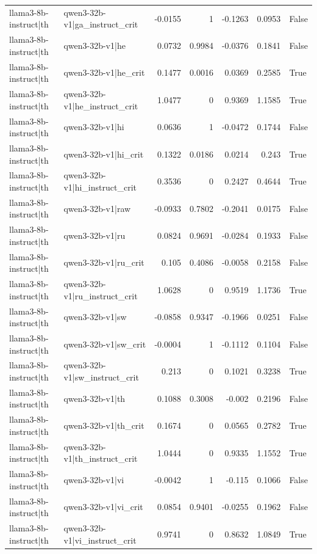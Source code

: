 \begin{table}
\begin{tabular}{l l r r r r l}
llama3-8b-instruct|th & qwen3-32b-v1|ga_instruct_crit & -0.0155 & 1 & -0.1263 & 0.0953 & False \\
llama3-8b-instruct|th & qwen3-32b-v1|he & 0.0732 & 0.9984 & -0.0376 & 0.1841 & False \\
llama3-8b-instruct|th & qwen3-32b-v1|he_crit & 0.1477 & 0.0016 & 0.0369 & 0.2585 & True \\
llama3-8b-instruct|th & qwen3-32b-v1|he_instruct_crit & 1.0477 & 0 & 0.9369 & 1.1585 & True \\
llama3-8b-instruct|th & qwen3-32b-v1|hi & 0.0636 & 1 & -0.0472 & 0.1744 & False \\
llama3-8b-instruct|th & qwen3-32b-v1|hi_crit & 0.1322 & 0.0186 & 0.0214 & 0.243 & True \\
llama3-8b-instruct|th & qwen3-32b-v1|hi_instruct_crit & 0.3536 & 0 & 0.2427 & 0.4644 & True \\
llama3-8b-instruct|th & qwen3-32b-v1|raw & -0.0933 & 0.7802 & -0.2041 & 0.0175 & False \\
llama3-8b-instruct|th & qwen3-32b-v1|ru & 0.0824 & 0.9691 & -0.0284 & 0.1933 & False \\
llama3-8b-instruct|th & qwen3-32b-v1|ru_crit & 0.105 & 0.4086 & -0.0058 & 0.2158 & False \\
llama3-8b-instruct|th & qwen3-32b-v1|ru_instruct_crit & 1.0628 & 0 & 0.9519 & 1.1736 & True \\
llama3-8b-instruct|th & qwen3-32b-v1|sw & -0.0858 & 0.9347 & -0.1966 & 0.0251 & False \\
llama3-8b-instruct|th & qwen3-32b-v1|sw_crit & -0.0004 & 1 & -0.1112 & 0.1104 & False \\
llama3-8b-instruct|th & qwen3-32b-v1|sw_instruct_crit & 0.213 & 0 & 0.1021 & 0.3238 & True \\
llama3-8b-instruct|th & qwen3-32b-v1|th & 0.1088 & 0.3008 & -0.002 & 0.2196 & False \\
llama3-8b-instruct|th & qwen3-32b-v1|th_crit & 0.1674 & 0 & 0.0565 & 0.2782 & True \\
llama3-8b-instruct|th & qwen3-32b-v1|th_instruct_crit & 1.0444 & 0 & 0.9335 & 1.1552 & True \\
llama3-8b-instruct|th & qwen3-32b-v1|vi & -0.0042 & 1 & -0.115 & 0.1066 & False \\
llama3-8b-instruct|th & qwen3-32b-v1|vi_crit & 0.0854 & 0.9401 & -0.0255 & 0.1962 & False \\
llama3-8b-instruct|th & qwen3-32b-v1|vi_instruct_crit & 0.9741 & 0 & 0.8632 & 1.0849 & True \\

\end{tabular}
\end{table}
